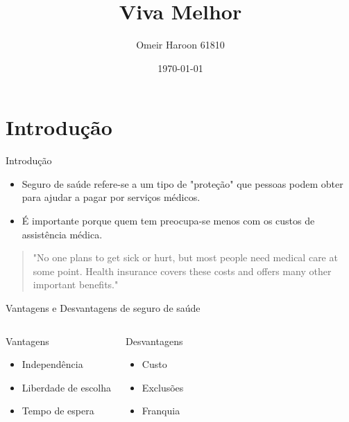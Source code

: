 \documentclass[10pt]{beamer}
\title{Viva Melhor}
\author{Omeir Haroon 61810}
\date{\today}
\begin{document}
\begin{frame}
    \titlepage
\end{frame}

\section{Introdução}
\begin{frame}{Introdução}
    \begin{itemize}
        \item Seguro de saúde refere-se a um tipo de "proteção" que pessoas podem obter para ajudar a pagar por serviços médicos.
        \item É importante porque quem tem preocupa-se menos com os custos de assistência médica.
    \end{itemize}

    \begin{quote}
        "No one plans to get sick or hurt, but most people need medical care at some point. Health insurance covers these costs and offers many other important benefits." \cite{healthcare}
    \end{quote}
\end{frame}

\begin{frame}{Vantagens e Desvantagens de seguro de saúde}
    \begin{columns}
        \begin{block}{Vantagens}
            \begin{itemize}
                \item Independência
                \item Liberdade de escolha
                \item Tempo de espera
            \end{itemize}
        \end{block}

        \begin{block}{Desvantagens}
            \begin{itemize}
                \item Custo
                \item Exclusões
                \item Franquia
            \end{itemize}
        \end{block}
    \end{columns}
\end{frame}
\end{document}

